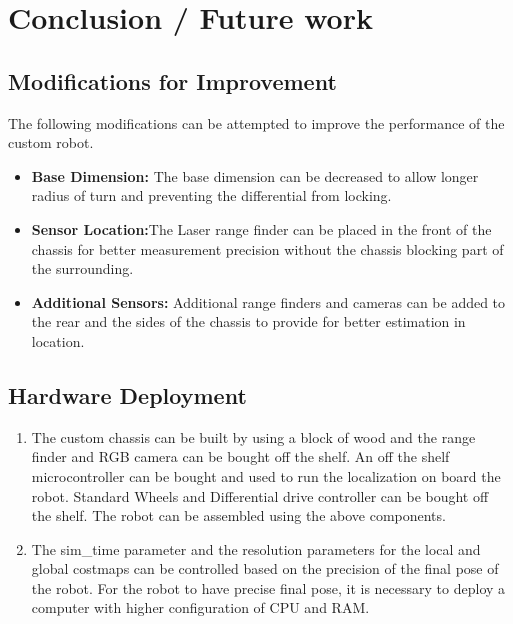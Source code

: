 \documentclass[10pt,journal,compsoc]{IEEEtran}
\begin{document}
\section{Conclusion / Future work}

\subsection{Modifications for Improvement}
The following modifications can be attempted to improve the performance of the custom robot. 
\begin{itemize}
\item \textbf{Base Dimension:} The base dimension can be decreased to allow longer radius of turn and preventing the differential from locking.
\item \textbf{Sensor Location:}The Laser range finder can be placed in the front of the chassis for better measurement precision without the chassis blocking part of the surrounding.
\item \textbf{Additional Sensors:} Additional range finders and cameras can be added to the rear and the sides of the chassis to provide for better estimation in location. 
\end{itemize}

\subsection{Hardware Deployment}
\begin{enumerate}
\item The custom chassis can be built by using a block of wood and the range finder and RGB camera can be bought off the shelf. An off the shelf microcontroller can be bought and used to run the localization on board the robot. Standard Wheels and Differential drive controller can be bought off the shelf. The robot can be assembled using the above components.
\item The sim\_time parameter and the resolution parameters for the local and global costmaps can be controlled based on the precision of the final pose of the robot. For the robot to have precise final pose, it is necessary to deploy a computer with higher configuration of CPU and RAM. 
\end{enumerate}





\end{document}
